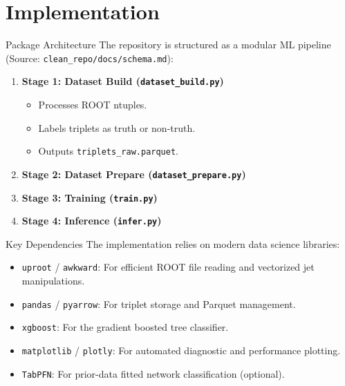 \documentclass{beamer}
\begin{document}
\section{Implementation}
\begin{frame}{Package Architecture}
  The repository is structured as a modular ML pipeline (Source: \texttt{clean\_repo/docs/schema.md}):
  \begin{enumerate}
    \item \textbf{Stage 1: Dataset Build (\texttt{dataset\_build.py})}
      \begin{itemize}
        \item Processes ROOT ntuples.
        \item Labels triplets as truth or non-truth.
        \item Outputs \texttt{triplets\_raw.parquet}.
      \end{itemize}
    \item \textbf{Stage 2: Dataset Prepare (\texttt{dataset\_prepare.py})}
    \item \textbf{Stage 3: Training (\texttt{train.py})}
    \item \textbf{Stage 4: Inference (\texttt{infer.py})}
  \end{enumerate}
\end{frame}

\begin{frame}{Key Dependencies}
  The implementation relies on modern data science libraries:
  \begin{itemize}
    \item \texttt{uproot} / \texttt{awkward}: For efficient ROOT file reading and vectorized jet manipulations.
    \item \texttt{pandas} / \texttt{pyarrow}: For triplet storage and Parquet management.
    \item \texttt{xgboost}: For the gradient boosted tree classifier.
    \item \texttt{matplotlib} / \texttt{plotly}: For automated diagnostic and performance plotting.
  \item \texttt{TabPFN}: For prior-data fitted network classification (optional).
  \end{itemize}
\end{frame}
\end{document}
